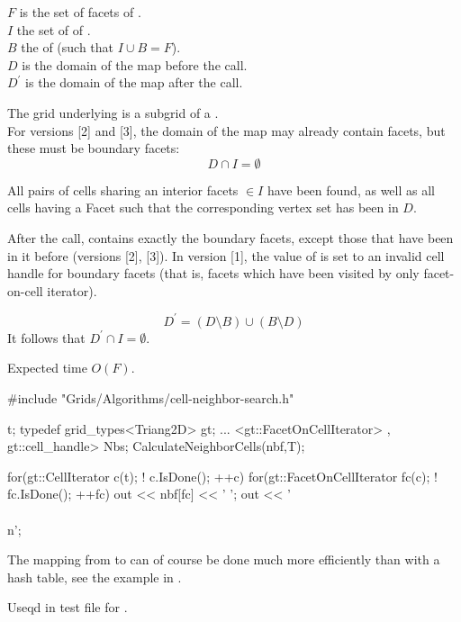 $F$ is the set of facets of .
\\
$I$  the set of  
of  .
\\$B$ the  of  
(such that $I \cup B = F$).
\\
$D$ is the domain of the map  before the call.
\\
$D^\prime$ is the domain of the map  after the call.

The grid underlying  is a 
subgrid of a .
\\
For versions [2] and [3],
the domain of the map 
 may already contain facets,
but these must be  boundary facets:
\[
   D \cap I = \emptyset
\]

All pairs of cells sharing an interior facets $\in I$ have been found,
as well as all cells having a Facet such that the corresponding 
vertex set has been in $D$.

After the call, 
contains exactly the boundary facets,
except those that have been in it before (versions [2], [3]).
In version [1], the value of  is set to an invalid cell handle
for boundary facets (that is, facets which have been visited by only
facet-on-cell iterator).


\[
  D^\prime = (D \setminus B) \cup (B \setminus D)
\]
It follows that  $D^\prime \cap I = \emptyset$.

Expected time $O(F)$.

\begin{example}
#include "Grids/Algorithms/cell-neighbor-search.h"

 t;
typedef grid_types<Triang2D> gt;
...
<gt::FacetOnCellIterator> , gt::cell_handle> Nbs;
CalculateNeighborCells(nbf,T);

for(gt::CellIterator c(t); ! c.IsDone(); ++c) {
  for(gt::FacetOnCellIterator fc(c); ! fc.IsDone(); ++fc)
    out << nbf[fc] << ' ';
  out << '\\\\n';
}
\end{example}
The mapping from  to 
can of course be done much more efficiently than with a hash table, see
the example in  .


Useqd in test file 
for .



